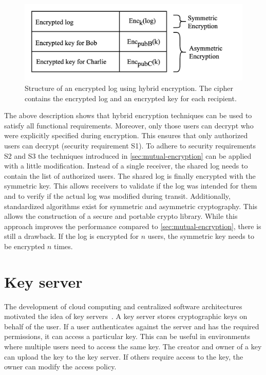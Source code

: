\documentclass[../main.tex]{subfiles}
\begin{document}
\begin{figure}[ht]
    \includegraphics[scale=0.21]{../img/04/hybrid_encryption.png}
    \centering
    \caption[Structure encrypted log]{Structure of an encrypted log using hybrid encryption. The cipher contains the encrypted log and an encrypted key for each recipient.}
    \label{fig:hybrid_encryption}
\end{figure}

The above description shows that hybrid encryption techniques can be used to satisfy all functional requirements.
Moreover, only those users can decrypt who were explicitly specified during encryption.
This ensures that only authorized users can decrypt (security requirement S1).
To adhere to security requirements S2 and S3 the techniques introduced in \cref{sec:mutual-encryption} can be applied with a little modification.
Instead of a single receiver, the shared log needs to contain the list of authorized users.
The shared log is finally encrypted with the symmetric key.
This allows receivers to validate if the log was intended for them and to verify if the actual log was modified during transit.
Additionally, standardized algorithms exist for symmetric and asymmetric cryptography.
This allows the construction of a secure and portable crypto library.
While this approach improves the performance compared to \cref{sec:mutual-encryption}, there is still a drawback.
If the log is encrypted for $n$ users, the symmetric key needs to be encrypted $n$ times.

\section{Key server}
\label{sec:key-server}

The development of cloud computing and centralized software architectures motivated the idea of key servers~\cite{Seitz2003}.
A key server stores cryptographic keys on behalf of the user.
If a user authenticates against the server and has the required permissions, it can access a particular key.
This can be useful in environments where multiple users need to access the same key.
The creator and owner of a key can upload the key to the key server.
If others require access to the key, the owner can modify the access policy.
\end{document}
